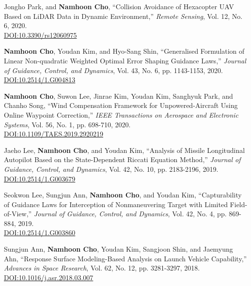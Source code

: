 \begin{enumerate}[itemsep=0.5em, label={[}J\arabic*{]}]
\item Jongho Park, and \textbf{Namhoon Cho}, ``Collision Avoidance of Hexacopter UAV Based on LiDAR Data in Dynamic Environment,'' \textit{Remote Sensing}, Vol. 12, No. 6, 2020. \\
\href{https://doi.org/10.3390/rs12060975}{DOI:10.3390/rs12060975}

\item \textbf{Namhoon Cho}, Youdan Kim, and Hyo-Sang Shin, ``Generalised Formulation of Linear Non-quadratic Weighted Optimal Error Shaping Guidance Laws,'' \textit{Journal of Guidance, Control, and Dynamics}, Vol. 43, No. 6, pp. 1143-1153, 2020. \\
\href{https://doi.org/10.2514/1.G004813}{DOI:10.2514/1.G004813}

\item \textbf{Namhoon Cho}, Suwon Lee, Jinrae Kim, Youdan Kim, Sanghyuk Park, and Chanho Song, ``Wind Compensation Framework for Unpowered-Aircraft Using Online Waypoint Correction,'' \textit{IEEE Transactions on Aerospace and Electronic Systems}, Vol. 56, No. 1, pp. 698-710, 2020. \\
\href{https://doi.org/10.1109/TAES.2019.2920219}{DOI:10.1109/TAES.2019.2920219}

\item Jaeho Lee, \textbf{Namhoon Cho}, and Youdan Kim, ``Analysis of Missile Longitudinal Autopilot Based on the State-Dependent Riccati Equation Method,'' \textit{Journal of Guidance, Control, and Dynamics}, Vol. 42, No. 10, pp. 2183-2196, 2019. \\
\href{https://doi.org/10.2514/1.G003679}{DOI:10.2514/1.G003679}

\item Seokwon Lee, Sungjun Ann, \textbf{Namhoon Cho}, and Youdan Kim, ``Capturability of Guidance Laws for Interception of Nonmaneuvering Target with Limited Field-of-View,'' \textit{Journal of Guidance, Control, and Dynamics}, Vol. 42, No. 4, pp. 869-884, 2019. \\
\href{https://doi.org/10.2514/1.G003860}{DOI:10.2514/1.G003860}

\item Sungjun Ann, \textbf{Namhoon Cho}, Youdan Kim, Sangjoon Shin, and Jaemyung Ahn, ``Response Surface Modeling-Based Analysis on Launch Vehicle Capability,'' \textit{Advances in Space Research}, Vol. 62, No. 12, pp. 3281-3297, 2018. \\
\href{https://doi.org/10.1016/j.asr.2018.03.007}{DOI:10.1016/j.asr.2018.03.007}


\end{enumerate}

